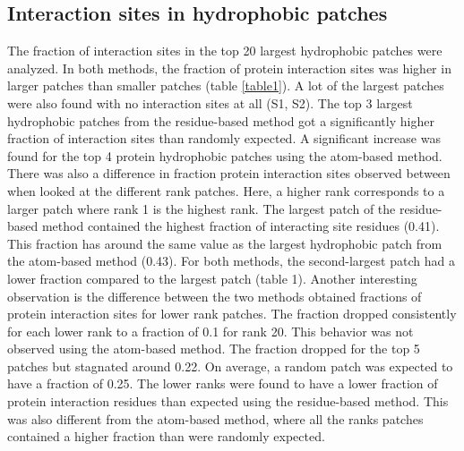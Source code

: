 \documentclass[11pt,a4paper]{article}
\begin{document}
\subsection{Interaction sites in hydrophobic patches}
The fraction of interaction sites in the top 20 largest hydrophobic patches were analyzed. In both methods, the fraction of protein interaction sites was higher in larger patches than smaller patches (table \ref{table1}). A lot of the largest patches were also found with no interaction sites at all  (S1, S2). The top 3 largest hydrophobic patches from the residue-based method got a significantly higher fraction of interaction sites than randomly expected. A significant increase was found for the top 4 protein hydrophobic patches using the atom-based method. There was also a difference in fraction protein interaction sites observed between when looked at the different rank patches. Here, a higher rank corresponds to a larger patch where rank 1 is the highest rank. The largest patch of the residue-based method contained the highest fraction of interacting site residues (0.41). This fraction has around the same value as the largest hydrophobic patch from the atom-based method (0.43). For both methods, the second-largest patch had a lower fraction compared to the largest patch (table 1). Another interesting observation is the difference between the two methods obtained fractions of protein interaction sites for lower rank patches. The fraction dropped consistently for each lower rank to a fraction of 0.1 for rank 20. This behavior was not observed using the atom-based method. The fraction dropped for the top 5 patches but stagnated around 0.22. On average, a random patch was expected to have a fraction of 0.25. The lower ranks were found to have a lower fraction of protein interaction residues than expected using the residue-based method. This was also different from the atom-based method, where all the ranks patches contained a higher fraction than were randomly expected.
\end{document}
